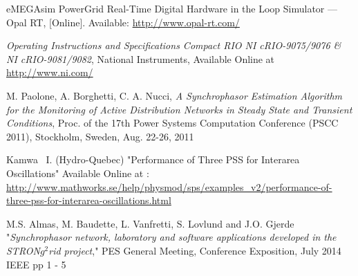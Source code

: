 \documentclass[conference]{IEEEtran}
\begin{document}
\begin{thebibliography}{1}
 eMEGAsim PowerGrid Real-Time Digital Hardware in the Loop Simulator — Opal RT, [Online]. Available: \url{http://www.opal-rt.com/}

 \emph{Operating Instructions and Specifications Compact RIO NI cRIO-9075/9076 \& NI cRIO-9081/9082}, National Instruments, Available Online at \url{http://www.ni.com/}

 M. Paolone, A. Borghetti, C. A. Nucci, \emph{A Synchrophasor Estimation Algorithm for the Monitoring of Active Distribution Networks in Steady State and Transient Conditions}, Proc. of the 17th Power Systems Computation Conference (PSCC 2011), Stockholm, Sweden, Aug. 22-26, 2011 

 Kamwa \ I. (Hydro-Quebec) "Performance of Three PSS for Interarea Oscillations" Available Online at : \url{http://www.mathworks.se/help/physmod/sps/examples_v2/performance-of-three-pss-for-interarea-oscillations.html}



 M.S. Almas, M. Baudette, L. Vanfretti, S. Lovlund and J.O. Gjerde "\emph{Synchrophasor network, laboratory and software applications developed in the STRON$g^{2}$rid project}," PES General Meeting, Conference Exposition, July 2014 IEEE pp 1 - 5





\end{thebibliography}
\end{document}
